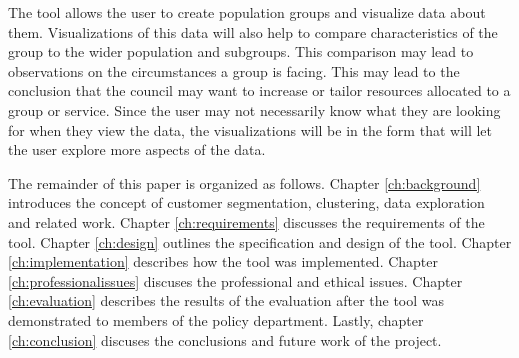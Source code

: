 \documentclass[11pt]{informatics-report}
\begin{document}
The tool allows the user to create population groups and visualize data about them. Visualizations of this data will also help to compare characteristics of the group to the wider population and subgroups. This comparison may lead to observations on the circumstances a group is facing. This may lead to the conclusion that the council may want to increase or tailor resources allocated to a group or service. Since the user may not necessarily know what they are looking for when they view the data, the visualizations will be in the form that will let the user explore more aspects of the data. \par

The remainder of this paper is organized as follows. Chapter \ref{ch:background} introduces the concept of customer segmentation, clustering, data exploration and related work. Chapter \ref{ch:requirements} discusses the requirements of the tool. Chapter \ref{ch:design} outlines the specification and design of the tool. Chapter \ref{ch:implementation} describes how the tool was implemented. Chapter \ref{ch:professionalissues} discuses the professional and ethical issues. Chapter \ref{ch:evaluation} describes the results of the evaluation after the tool was demonstrated to members of the policy department. Lastly, chapter \ref{ch:conclusion} discuses the conclusions and future work of the project.












\appendix
%


\end{document}
